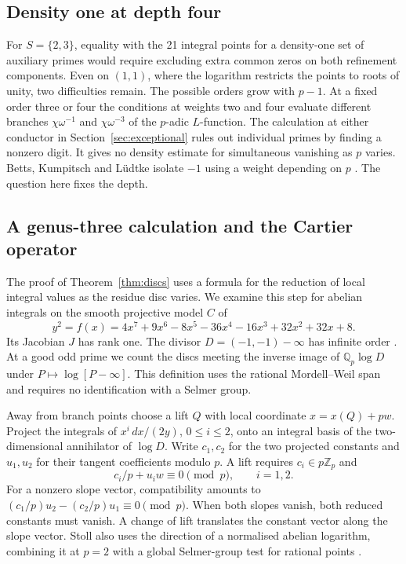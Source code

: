\subsection{Density one at depth four}
For \(S=\{2,3\}\), equality with the 21 integral points for a density-one
set of auxiliary primes would require excluding extra common zeros on
both refinement components. Even on \((1,1)\), where the logarithm
restricts the points to roots of unity, two difficulties remain. The
possible orders grow with \(p-1\). At a fixed order three or four the
conditions at weights two and four evaluate different branches
\(\chi\omega^{-1}\) and \(\chi\omega^{-3}\) of the \(p\)-adic \(L\)-function.
The calculation at either conductor in Section~\ref{sec:exceptional}
rules out individual primes by finding a nonzero digit. It gives no
density estimate for simultaneous vanishing as \(p\) varies.
Betts, Kumpitsch and L\"udtke isolate \(-1\) using a weight depending on
\(p\) \cite[Proposition~5.15]{BKL}. The question here fixes the depth.

\subsection{A genus-three calculation and the Cartier operator}
The proof of Theorem~\ref{thm:discs} uses a formula for the reduction of
local integral values as the residue disc varies. We examine this step
for abelian integrals on the smooth projective model \(C\) of
\[
 y^2=f(x)=4x^7+9x^6-8x^5-36x^4-16x^3+32x^2+32x+8.
\]
Its Jacobian \(J\) has rank one. The divisor \(D=(-1,-1)-\infty\) has
infinite order \cite[Example~4.1]{GenusThree}. At a good odd prime we
count the discs meeting the inverse image of \(\mathbb Q_p\log D\)
under \(P\mapsto\log[P-\infty]\). This definition uses the rational
Mordell--Weil span and requires no identification with a Selmer group.

Away from branch points choose a lift \(Q\) with local coordinate
\(x=x(Q)+pw\). Project the integrals of \(x^i\,dx/(2y)\), \(0\le i\le2\),
onto an integral basis of the two-dimensional annihilator of \(\log D\).
Write \(c_1,c_2\) for the two projected constants and \(u_1,u_2\) for their
tangent coefficients modulo \(p\). A lift requires \(c_i\in p\mathbb Z_p\)
and
\[
                 c_i/p+u_iw\equiv 0 \pmod p,\qquad i=1,2.
\]
For a nonzero slope vector, compatibility amounts to
\((c_1/p)u_2-(c_2/p)u_1\equiv0\pmod p\). When both slopes vanish, both
reduced constants must vanish. A change of lift translates the constant
vector along the slope vector. Stoll also uses the direction of a
normalised abelian logarithm, combining it at \(p=2\) with a global
Selmer-group test for rational points \cite[Proposition~2.8]{Stoll}.


